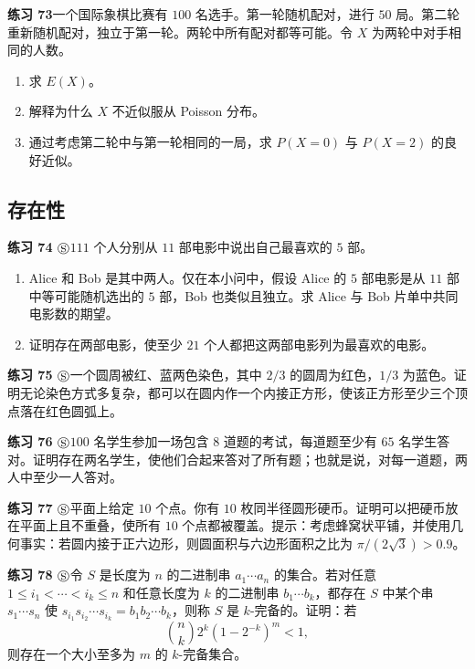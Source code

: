 \documentclass[UTF8,12pt,a4paper,fontset=fandol]{ctexart}
\begin{document}
\noindent\textbf{练习 73}\quad 一个国际象棋比赛有 $100$ 名选手。第一轮随机配对，进行 $50$ 局。第二轮重新随机配对，独立于第一轮。两轮中所有配对都等可能。令 $X$ 为两轮中对手相同的人数。
\begin{enumerate}
  \item[(a)] 求 $E(X)$。
  \item[(b)] 解释为什么 $X$ 不近似服从 Poisson 分布。
  \item[(c)] 通过考虑第二轮中与第一轮相同的一局，求 $P(X=0)$ 与 $P(X=2)$ 的良好近似。
\end{enumerate}

\subsection*{存在性}

\noindent\textbf{练习 74 $\circledS$}\quad $111$ 个人分别从 $11$ 部电影中说出自己最喜欢的 $5$ 部。
\begin{enumerate}
  \item[(a)] Alice 和 Bob 是其中两人。仅在本小问中，假设 Alice 的 $5$ 部电影是从 $11$ 部中等可能随机选出的 $5$ 部，Bob 也类似且独立。求 Alice 与 Bob 片单中共同电影数的期望。
  \item[(b)] 证明存在两部电影，使至少 $21$ 个人都把这两部电影列为最喜欢的电影。
\end{enumerate}

\noindent\textbf{练习 75 $\circledS$}\quad 一个圆周被红、蓝两色染色，其中 $2/3$ 的圆周为红色，$1/3$ 为蓝色。证明无论染色方式多复杂，都可以在圆内作一个内接正方形，使该正方形至少三个顶点落在红色圆弧上。

\noindent\textbf{练习 76 $\circledS$}\quad $100$ 名学生参加一场包含 $8$ 道题的考试，每道题至少有 $65$ 名学生答对。证明存在两名学生，使他们合起来答对了所有题；也就是说，对每一道题，两人中至少一人答对。

\noindent\textbf{练习 77 $\circledS$}\quad 平面上给定 $10$ 个点。你有 $10$ 枚同半径圆形硬币。证明可以把硬币放在平面上且不重叠，使所有 $10$ 个点都被覆盖。提示：考虑蜂窝状平铺，并使用几何事实：若圆内接于正六边形，则圆面积与六边形面积之比为 $\pi/(2\sqrt3)>0.9$。

\noindent\textbf{练习 78 $\circledS$}\quad 令 $S$ 是长度为 $n$ 的二进制串 $a_1\cdots a_n$ 的集合。若对任意 $1\le i_1<\cdots<i_k\le n$ 和任意长度为 $k$ 的二进制串 $b_1\cdots b_k$，都存在 $S$ 中某个串 $s_1\cdots s_n$ 使 $s_{i_1}s_{i_2}\cdots s_{i_k}=b_1b_2\cdots b_k$，则称 $S$ 是 $k$-完备的。证明：若
\[
  \binom{n}{k}2^k(1-2^{-k})^m<1,
\]
则存在一个大小至多为 $m$ 的 $k$-完备集合。
\end{document}
